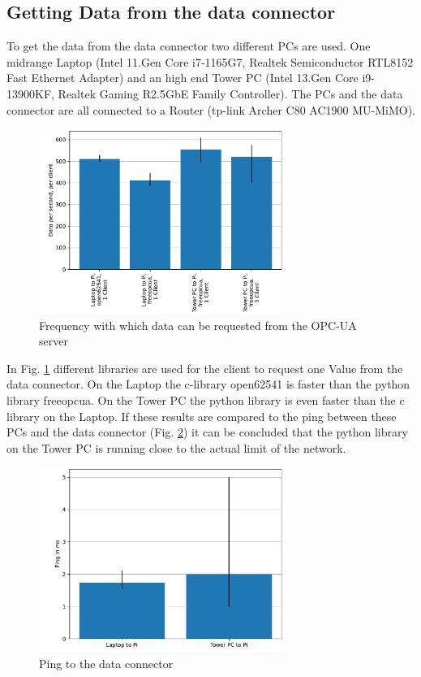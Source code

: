 \documentclass[conference]{IEEEtran}
\begin{document}
\subsection{Getting Data from the data connector}
To get the data from the data connector two different PCs are used. One midrange Laptop (Intel 11.Gen Core i7-1165G7, Realtek Semiconductor
RTL8152 Fast Ethernet Adapter) and an high end Tower PC (Intel 13.Gen Core i9-13900KF, Realtek Gaming R2.5GbE Family Controller).
The PCs and the data connector are all connected to a Router (tp-link Archer C80 AC1900 MU-MiMO).\\
\begin{figure}[htbp]
    \centerline{\includegraphics[width=8cm]{Pictures/OPCUASpeed1D.pdf}}
    \caption{Frequency with which data can be requested from the OPC-UA server}
    \label{fig:OPCUASpeed1D}
\end{figure}
In Fig. \ref{fig:OPCUASpeed1D} different libraries are used for the client to request one Value from the data connector.
On the Laptop the c-library open62541 is faster than the python library freeopcua.
On the Tower PC the python library is even faster than the c library on the Laptop.
If these results are compared to the ping between these PCs and the data connector (Fig. \ref{fig:PingDiagram}) it can be concluded that the python library on the Tower PC is running close to the actual limit of the network.\\
\begin{figure}[htbp]
    \centerline{\includegraphics[width=8cm]{Pictures/PingDiagram.pdf}}
    \caption{Ping to the data connector}
    \label{fig:PingDiagram}
\end{figure}
\end{document}
